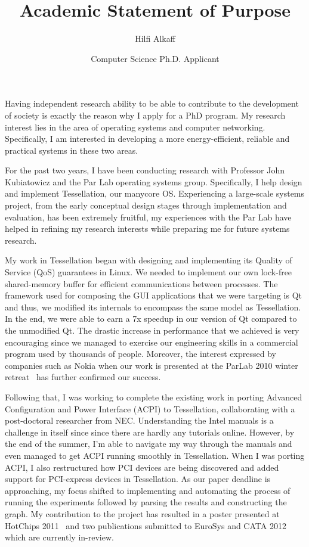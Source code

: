 \documentclass[11pt]{article}
\title{Academic Statement of Purpose}
\author{Hilfi Alkaff}
\date{Computer Science Ph.D. Applicant}
\begin{document}
  \maketitle%

Having independent research ability to be able to contribute to the development of society is exactly the reason why I apply for a PhD program. My research interest lies in the area of operating systems and computer networking. Specifically, I am interested in developing a more energy-efficient, reliable and practical systems in these two areas. \newline

For the past two years, I have been conducting research with Professor John Kubiatowicz and the Par Lab operating systems group. Specifically, I help design and implement Tessellation, our manycore OS. Experiencing a large-scale systems project, from the early conceptual design stages through implementation and evaluation, has been extremely fruitful, my experiences with the Par Lab have helped in refining my research interests while preparing me for future systems research. \newline

My work in Tessellation began with designing and implementing its Quality of Service (QoS) guarantees in Linux. We needed to implement our own lock-free shared-memory buffer for efficient communications between processes. The framework used for composing the GUI applications that we were targeting is Qt and thus, we modified its internals to encompass the same model as Tessellation. In the end, we were able to earn a 7x speedup in our version of Qt compared to the unmodified Qt. The drastic increase in performance that we achieved is very encouraging since we managed to exercise our engineering skills in a commercial program used by thousands of people. Moreover, the interest expressed by companies such as Nokia when our work is presented at the ParLab 2010 winter retreat~\cite{tess_retreat2010} has further confirmed our success. \newline

Following that, I was working to complete the existing work in porting Advanced Configuration and Power Interface (ACPI) to Tessellation, collaborating with a post-doctoral researcher from NEC. Understanding the Intel manuals is a challenge in itself since since there are hardly any tutorials online. However, by the end of the summer, I'm able to navigate my way through the manuals and even managed to get ACPI running smoothly in Tessellation. When I was porting ACPI, I also restructured how PCI devices are being discovered and added support for PCI-express devices in Tessellation. As our paper deadline is approaching, my focus shifted to implementing and automating the process of running the experiments followed by parsing the results and constructing the graph. My contribution to the project has resulted in a poster presented at HotChips 2011~\cite{tess_hotchip} and two publications submitted to EuroSys and CATA 2012~\cite{tess_eurosys, tess_cata} which are currently in-review. \newline
\end{document}
